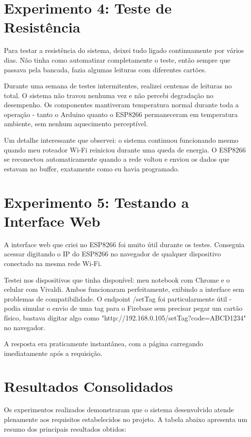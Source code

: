 \section{Experimento 4: Teste de Resistência}

Para testar a resistência do sistema, deixei tudo ligado continuamente por vários dias. Não tinha como automatizar completamente o teste, então sempre que passava pela bancada, fazia algumas leituras com diferentes cartões.

Durante uma semana de testes intermitentes, realizei centenas de leituras no total. O sistema não travou nenhuma vez e não percebi degradação no desempenho. Os componentes mantiveram temperatura normal durante toda a operação - tanto o Arduino quanto o ESP8266 permaneceram em temperatura ambiente, sem nenhum aquecimento perceptível.

Um detalhe interessante que observei: o sistema continuou funcionando mesmo quando meu roteador Wi-Fi reiniciou durante uma queda de energia. O ESP8266 se reconectou automaticamente quando a rede voltou e enviou os dados que estavam no buffer, exatamente como eu havia programado.

\section{Experimento 5: Testando a Interface Web}

A interface web que criei no ESP8266 foi muito útil durante os testes. Conseguia acessar digitando o IP do ESP8266 no navegador de qualquer dispositivo conectado na mesma rede Wi-Fi.

Testei nos dispositivos que tinha disponível: meu notebook com Chrome e o celular com Vivaldi. Ambos funcionaram perfeitamente, exibindo a interface sem problemas de compatibilidade. O endpoint /setTag foi particularmente útil - podia simular o envio de uma tag para o Firebase sem precisar pegar um cartão físico, bastava digitar algo como "http://192.168.0.105/setTag?code=ABCD1234" no navegador.

A resposta era praticamente instantânea, com a página carregando imediatamente após a requisição.


\section{Resultados Consolidados}

Os experimentos realizados demonstraram que o sistema desenvolvido atende plenamente aos requisitos estabelecidos no projeto. A tabela abaixo apresenta um resumo dos principais resultados obtidos:

